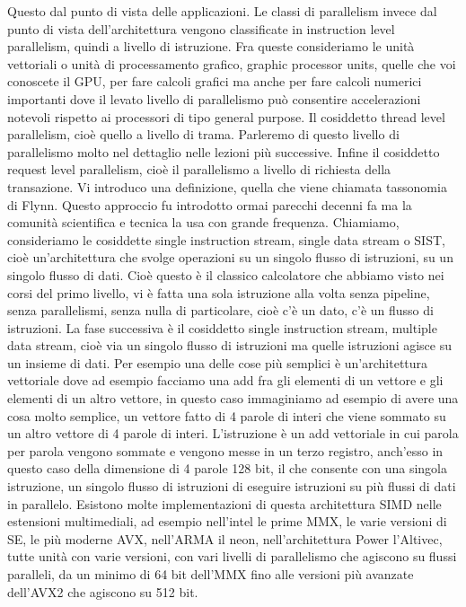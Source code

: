 Questo dal punto di vista delle applicazioni.
Le classi di parallelism invece dal punto di vista dell'architettura vengono classificate in instruction level parallelism, quindi a livello di istruzione.
Fra queste consideriamo le unità vettoriali o unità di processamento grafico, graphic processor units, quelle che voi conoscete il GPU, per fare calcoli grafici ma anche per fare calcoli numerici importanti dove il levato livello di parallelismo può consentire accelerazioni notevoli rispetto ai processori di tipo general purpose.
Il cosiddetto thread level parallelism, cioè quello a livello di trama.
Parleremo di questo livello di parallelismo molto nel dettaglio nelle lezioni più successive.
Infine il cosiddetto request level parallelism, cioè il parallelismo a livello di richiesta della transazione.
Vi introduco una definizione, quella che viene chiamata tassonomia di Flynn.
Questo approccio fu introdotto ormai parecchi decenni fa ma la comunità scientifica e tecnica la usa con grande frequenza.
Chiamiamo, consideriamo le cosiddette single instruction stream, single data stream o SIST, cioè un'architettura che svolge operazioni su un singolo flusso di istruzioni, su un singolo flusso di dati.
Cioè questo è il classico calcolatore che abbiamo visto nei corsi del primo livello, vi è fatta una sola istruzione alla volta senza pipeline, senza parallelismi, senza nulla di particolare, cioè c'è un dato, c'è un flusso di istruzioni.
La fase successiva è il cosiddetto single instruction stream, multiple data stream, cioè via un singolo flusso di istruzioni ma quelle istruzioni agisce su un insieme di dati.
Per esempio una delle cose più semplici è un'architettura vettoriale dove ad esempio facciamo una add fra gli elementi di un vettore e gli elementi di un altro vettore, in questo caso immaginiamo ad esempio di avere una cosa molto semplice, un vettore fatto di 4 parole di interi che viene sommato su un altro vettore di 4 parole di interi.
L'istruzione è un add vettoriale in cui parola per parola vengono sommate e vengono messe in un terzo registro, anch'esso in questo caso della dimensione di 4 parole 128 bit, il che consente con una singola istruzione, un singolo flusso di istruzioni di eseguire istruzioni su più flussi di dati in parallelo.
Esistono molte implementazioni di questa architettura SIMD nelle estensioni multimediali, ad esempio nell'intel le prime MMX, le varie versioni di SE, le più moderne AVX, nell'ARMA il neon, nell'architettura Power l'Altivec, tutte unità con varie versioni, con vari livelli di parallelismo che agiscono su flussi paralleli, da un minimo di 64 bit dell'MMX fino alle versioni più avanzate dell'AVX2 che agiscono su 512 bit.
